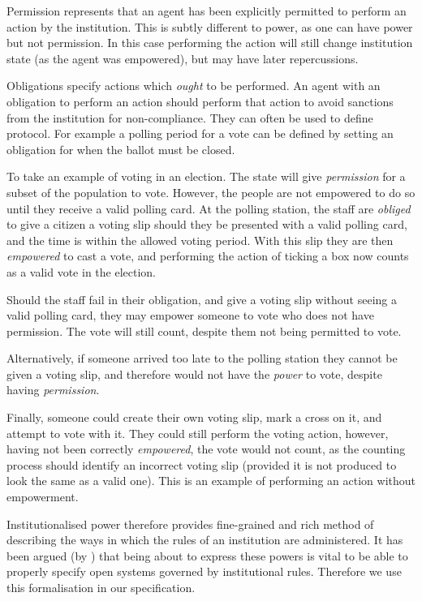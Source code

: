 Permission represents that an agent has been explicitly permitted to perform
an action by the institution. This is subtly different to power, as one can
have power but not permission. In this case performing the action will still
change institution state (as the agent was empowered), but may have later
repercussions.

Obligations specify actions which \emph{ought} to be performed. An agent with
an obligation to perform an action should perform that action to avoid
sanctions from the institution for non-compliance. They can often be used to
define protocol. For example a polling period for a vote can be defined by
setting an obligation for when the ballot must be closed.

To take an example of voting in an election. The state will
give \emph{permission} for a subset of the population to vote. However, the
people are not empowered to do so until they receive a valid polling card. At
the polling station, the staff are \emph{obliged} to give a citizen a voting
slip should they be presented with a valid polling card, and the time is
within the allowed voting period. With this slip they are then
\emph{empowered} to cast a vote, and performing the action of ticking a box
now counts as a valid vote in the election.

Should the staff fail in their obligation, and give a voting slip without
seeing a valid polling card, they may empower someone to vote who does not
have permission. The vote will still count, despite them not being permitted
to vote.

Alternatively, if someone arrived too late to the polling station they cannot
be given a voting slip, and therefore would not have the \emph{power} to vote,
despite having \emph{permission}.

Finally, someone could create their own voting slip, mark a cross on it, and
attempt to vote with it. They could still perform the voting action, however,
having not been correctly \emph{empowered}, the vote would not count, as the
counting process should identify an incorrect voting slip (provided it is not
produced to look the same as a valid one). This is an example of
performing an action without empowerment.

Institutionalised power therefore provides fine-grained and rich method of
describing the ways in which the rules of an institution are administered. It
has been argued (by \citet{Artikis2009a}) that being about to express these
powers is vital to be able to properly specify open systems governed by
institutional rules. Therefore we use this formalisation in our specification.

